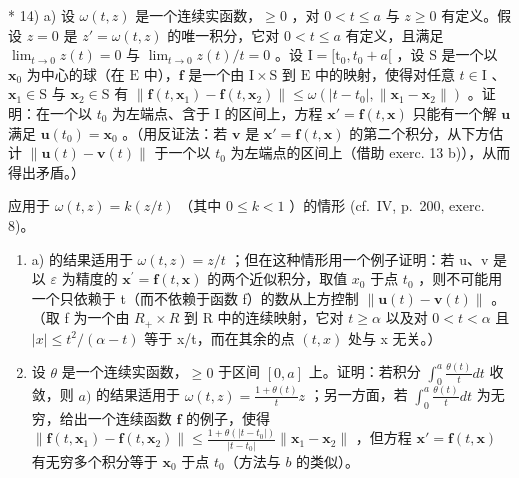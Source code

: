 * 14) a) 设 \(\omega(t,z)\) 是一个连续实函数，\(\geqslant 0\) ，对 \(0 < t \leqslant a\) 与 \(z \geqslant 0\) 有定义。假设 \(z = 0\) 是 \(z' = \omega(t,z)\) 的唯一积分，它对 \(0 < t \leqslant a\) 有定义，且满足 \(\lim_{t \to 0} z(t) = 0\) 与 \(\lim_{t \to 0} z(t)/t = 0\) 。设 \(\mathrm{I} = [\mathrm{t}_0, t_0 + a[\) ，设 \(\mathrm{S}\) 是一个以 \(\mathbf{x}_0\) 为中心的球（在 \(\mathrm{E}\) 中），\(\mathbf{f}\) 是一个由 \(\mathrm{I} \times \mathrm{S}\) 到 \(\mathrm{E}\) 中的映射，使得对任意 \(t \in \mathrm{I}\) 、\(\mathbf{x}_1 \in \mathrm{S}\) 与 \(\mathbf{x}_2 \in \mathrm{S}\) 有 \(\|\mathbf{f}(t, \mathbf{x}_1) - \mathbf{f}(t, \mathbf{x}_2)\| \leqslant \omega(|t - t_0|, \| \mathbf{x}_1 - \mathbf{x}_2 \|)\) 。证明：在一个以 \(t_0\) 为左端点、含于 \(\mathrm{I}\) 的区间上，方程 \(\mathbf{x}' = \mathbf{f}(t, \mathbf{x})\) 只能有一个解 \(\mathbf{u}\) 满足 \(\mathbf{u}(t_0) = \mathbf{x}_0\) 。（用反证法：若 \(\mathbf{v}\) 是 \(\mathbf{x}' = \mathbf{f}(t, \mathbf{x})\) 的第二个积分，从下方估计 \(\|\mathbf{u}(t) - \mathbf{v}(t)\|\) 于一个以 \(t_0\) 为左端点的区间上（借助 exerc. 13 b)），从而得出矛盾。）

应用于 \(\omega(t, z) = k(z/t)\) （其中 \(0 \leqslant k < 1\) ）的情形 (cf.~IV, p.~200, exerc. 8)。

\begin{enumerate}
\def\labelenumi{\alph{enumi})}
\setcounter{enumi}{1}
\item
  a) 的结果适用于 \(\omega(t,z)=z/t\) ；但在这种情形用一个例子证明：若 u、v 是以 \(\varepsilon\) 为精度的 \(\mathbf{x}^{\prime}=\mathbf{f}(t,\mathbf{x})\) 的两个近似积分，取值 \(x_{0}\) 于点 \(t_{0}\) ，则不可能用一个只依赖于 t（而不依赖于函数 f）的数从上方控制 \(\|\mathbf{u}(t)-\mathbf{v}(t)\|\) 。（取 f 为一个由 \(R_{+}\times R\) 到 R 中的连续映射，它对 \(t\geqslant\alpha\) 以及对 \(0<t<\alpha\) 且 \(|x|\leqslant t^{2}/(\alpha-t)\) 等于 x/t，而在其余的点 \((t,x)\) 处与 x 无关。）
\item
  设 \(\theta\) 是一个连续实函数，\(\geqslant 0\) 于区间 \([0, a]\) 上。证明：若积分 \(\int_0^a \frac{\theta(t)}{t} dt\) 收敛，则 \(a)\) 的结果适用于 \(\omega(t, z) = \frac{1 + \theta(t)}{t} z\) ；另一方面，若 \(\int_0^a \frac{\theta(t)}{t} dt\) 为无穷，给出一个连续函数 \(\mathbf{f}\) 的例子，使得 \(\| \mathbf{f}(t, \mathbf{x}_1) - \mathbf{f}(t, \mathbf{x}_2) \| \leqslant \frac{1 + \theta(|t - t_0|)}{|t - t_0|} \| \mathbf{x}_1 - \mathbf{x}_2 \|\) ，但方程 \(\mathbf{x}' = \mathbf{f}(t, \mathbf{x})\) 有无穷多个积分等于 \(\mathbf{x}_0\) 于点 \(t_0\)（方法与 \(b\) 的类似）。
\end{enumerate}

